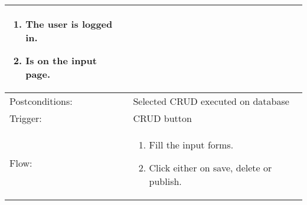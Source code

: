 \begin{longtable}{| p{3.5cm} | p{9cm} |}
\begin{enumerate}
\item The user is logged in.
\item Is on the input page.
\end{enumerate}\\
\hline
Postconditions: & Selected CRUD executed on database \\
\hline
Trigger: & CRUD button\\
\hline
Flow: &\mbox{}\par\vspace{-\baselineskip}
\begin{enumerate}
\item Fill the input forms.
\item Click either on save, delete or publish.
\end{enumerate}\\
\hline
\end{longtable}

